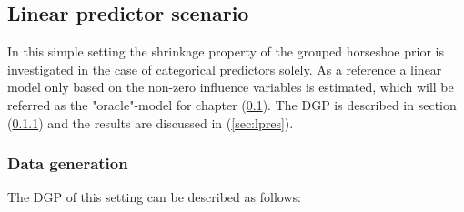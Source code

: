 \documentclass[12pt,letterpaper]{article}
\numberwithin{equation}{subsection}
\begin{document}
\subsection{Linear predictor scenario}
\label{sec:lp}
In this simple setting the shrinkage property of the grouped horseshoe prior is investigated in the case of categorical predictors solely. As a reference a linear model only based on the non-zero influence variables is estimated, which will be referred as the "oracle"-model for chapter (\ref{sec:lp}). The DGP is described in section (\ref{sec:lpdgp}) and the results are discussed in (\ref{sec:lpres}).

\subsubsection{Data generation}
\label{sec:lpdgp}
The DGP of this setting can be described as follows:
\end{document}
